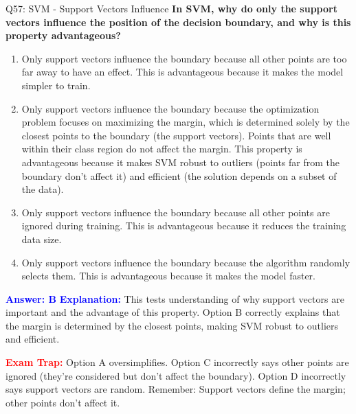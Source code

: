 \documentclass[8pt]{beamer}
\begin{document}
	\begin{frame}{Q57: SVM - Support Vectors Influence}
		\fontsize{6.5}{7.5}\selectfont
		\textbf{In SVM, why do only the support vectors influence the position of the decision boundary, and why is this property advantageous?}
		
		\begin{enumerate}
			\item Only support vectors influence the boundary because all other points are too far away to have an effect. This is advantageous because it makes the model simpler to train.
			\item Only support vectors influence the boundary because the optimization problem focuses on maximizing the margin, which is determined solely by the closest points to the boundary (the support vectors). Points that are well within their class region do not affect the margin. This property is advantageous because it makes SVM robust to outliers (points far from the boundary don't affect it) and efficient (the solution depends on a subset of the data).
			\item Only support vectors influence the boundary because all other points are ignored during training. This is advantageous because it reduces the training data size.
			\item Only support vectors influence the boundary because the algorithm randomly selects them. This is advantageous because it makes the model faster.
		\end{enumerate}
		
		\vspace{0.1cm}
		\textcolor{blue}{\textbf{Answer: B}}
		\vspace{0.1cm}
		\textcolor{blue}{\textbf{Explanation:}} This tests understanding of why support vectors are important and the advantage of this property. Option B correctly explains that the margin is determined by the closest points, making SVM robust to outliers and efficient.
		
		\textcolor{red}{\textbf{Exam Trap:}} Option A oversimplifies. Option C incorrectly says other points are ignored (they're considered but don't affect the boundary). Option D incorrectly says support vectors are random. Remember: Support vectors define the margin; other points don't affect it.
	\end{frame}
	
\end{document}
